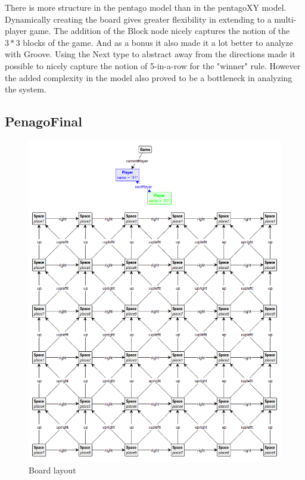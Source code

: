 \vspace{6pt}

There is more structure in the pentago model than in the pentagoXY model. Dynamically creating the board gives greater flexibility in extending to a multi-player game.
The addition of the Block node nicely captures the notion of the $3*3$ blocks of the game. And as a bonus it also made it a lot better to analyze with Groove.
Using the Next type to abstract away from the directions made it possible to nicely capture the notion of 5-in-a-row for the "winner" rule. However the added complexity in the model also proved to be a bottleneck in analyzing the system.

\subsection{PenagoFinal}

\begin{figure}[!h]
    \centering
    \includegraphics[scale=0.35,clip]{Images/board1.png}
    \caption{Board layout}
    \label{fig:board1}
\end{figure}

